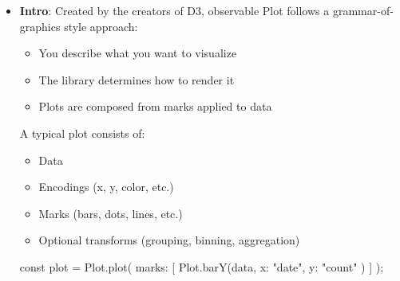 \documentclass{report}
\begin{document}
    \pagebreak 
    \begin{itemize}
        \item \textbf{Intro}: Created by the creators of D3, observable Plot follows a grammar-of-graphics style approach:
            \begin{itemize}
                \item You describe what you want to visualize
                \item The library determines how to render it
                \item Plots are composed from marks applied to data
            \end{itemize}
            A typical plot consists of:
            \begin{itemize}
                \item Data
                \item Encodings (x, y, color, etc.)
                \item Marks (bars, dots, lines, etc.)
                \item Optional transforms (grouping, binning, aggregation)
            \end{itemize}
            \bigbreak \noindent 
            \begin{jscode}
                const plot = Plot.plot({
                    marks: [
                        Plot.barY(data, { x: "date", y: "count" })
                    ]
                });


\end{jscode}
\end{itemize}
\end{document}
